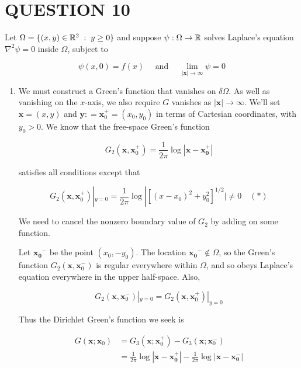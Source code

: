 \documentclass[a4paper]{article}
\begin{document}
\section{QUESTION 10}

Let $ \Omega = \{  (x,y) \in \mathbb{R}^{2} \; : \; y \geq 0 \} $ and suppose $ \psi : \Omega \to \mathbb{R} $ solves Laplace's equation $ \nabla^{2} \psi = 0 $ inside $ \Omega $, subject to

\[ \psi(x,0) = f(x) \quad \text{ and } \quad \lim\limits_{| \mathbf{x} | \to \infty} \psi = 0 \]

\begin{enumerate}
	\item We must construct a Green's function that vanishes on $ \delta \Omega $. As well as vanishing on the $ x $-axis, we also require $ G $ vanishes as $ | \mathbf{x} | \to \infty $. We'll set $ \mathbf{x} = (x,y) $ and $ \mathbf{y} : = \mathbf{x}_{0}^{+} = (x_{0},y_{0}) $ in terms of Cartesian coordinates, with $ y_{0} > 0 $. We know that the free-space Green's function
	
	\[ G_{2}(\mathbf{x},\mathbf{x}_{0}^{+}) = \frac{1}{2\pi} \log |  \mathbf{x} - \mathbf{x_{0}^{+}} | \]
	
	satisfies all conditions except that
	
		\[ G_{2}(\mathbf{x},\mathbf{x}_{0}^{+}) |_{y = 0} = \frac{1}{2\pi} \log | [ (x - x_{0})^{2} + y_{0}^{2} ]^{1/2} | \neq 0 \quad (*)  \]
		
	We need to cancel the nonzero boundary value of $ G_{2} $ by adding on some function.
	
	Let $ \mathbf{x_{0}}^{-} $ be the point $ (x_{0},-y_{0}) $. The location $ \mathbf{x_{0}}^{-} \notin \Omega $, so the Green's function $ G_{2}(\mathbf{x},\mathbf{x}_{0}^{-}) $ is regular everywhere within $ \Omega $, and so obeys Laplace's equation everywhere in the upper half-space. Also,
	
	\[ G_{2}(\mathbf{x},\mathbf{x}_{0}^{-}) |_{y = 0} = G_{2}(\mathbf{x},\mathbf{x}_{0}^{+}) |_{y = 0} \]
	
	Thus the Dirichlet Green's function we seek is 
	
	\begin{align*}
	G(\mathbf{x} ; \mathbf{x}_{0} )& = G_{3} (\mathbf{x} ; \mathbf{x}_{0}^{+}) - G_{3} (\mathbf{x} ; \mathbf{x}_{0}^{-})   \\
	& =  \frac{1}{2\pi} \log |  \mathbf{x} - \mathbf{x_{0}^{+}} | -  \frac{1}{2\pi} \log |  \mathbf{x} - \mathbf{x_{0}^{-}} |
	\end{align*}
	

\end{enumerate}
\end{document}
